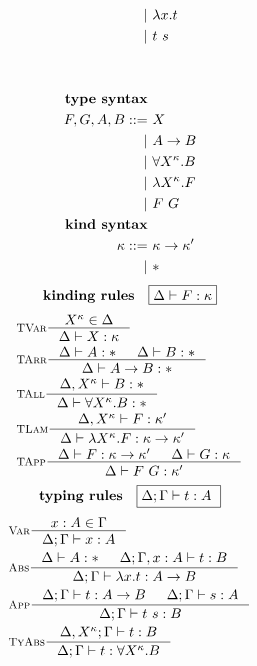 \begin{figure}
\begin{singlespace}
\begin{minipage}{.46\textwidth}
\begin{align*}
      | &~ \lambda x    . t \\
      | &~ t ~ s       \\
      \phantom{|} &~ \\
      \phantom{|} &~ \\
\textbf{type syntax} \\
F,G,A,B ::= &~ X                  \\
          | &~ A -> B             \\
          | &~ \forall X^\kappa.B \\
          | &~ \lambda X^\kappa.F      \\
          | &~ F ~ G              \\
\textbf{kind syntax} \\
\kappa ::= &~ \kappa -> \kappa' \\
         | &~ *                 \\
\end{align*}
\[ \textbf{kinding rules} \quad \framebox{$ \Delta |- F:\kappa$}\]\vspace*{-1em}
\begin{align*}
& \inference[\sc TVar]{X^\kappa \in \Delta}{\Delta |- X:\kappa} \\
& \inference[\sc TArr]{\Delta |- A:* & \Delta |- B:*}{\Delta |- A -> B:*} \\
& \inference[\sc TAll]{\Delta,X^\kappa |- B:*}{\Delta |- \forall X^\kappa.B:*} \\
& \inference[\sc TLam]{\Delta,X^\kappa |- F:\kappa'}
                      {\Delta |- \l X^\kappa.F:\kappa -> \kappa'} \\
& \inference[\sc TApp]{\Delta |- F : \kappa -> \kappa' & \Delta |- G : \kappa}
                      {\Delta |- F ~ G : \kappa'} \\
\end{align*}
\[ \textbf{typing rules} \quad \framebox{$ \Delta;\Gamma |- t : A $ } \]
\vspace*{-1em}
\begin{align*}
& \inference[\sc Var]{x:A \in \Gamma}{\Delta;\Gamma |- x:A} \\
& \inference[\sc Abs]{\Delta |- A:* & \Delta;\Gamma,x:A |- t : B}
                     {\Delta;\Gamma |- \l x   .t : A -> B} \\
& \inference[\sc App]{\Delta;\Gamma |- t : A -> B & \Delta;\Gamma |- s : A}
                     {\Delta;\Gamma |- t~s : B} \\
& \inference[\sc TyAbs]{\Delta,X^\kappa;\Gamma |- t : B}
                       {\Delta;\Gamma |- t : \forall X^\kappa.B}

\end{align*}
\end{minipage}
\end{singlespace}
\end{figure}

